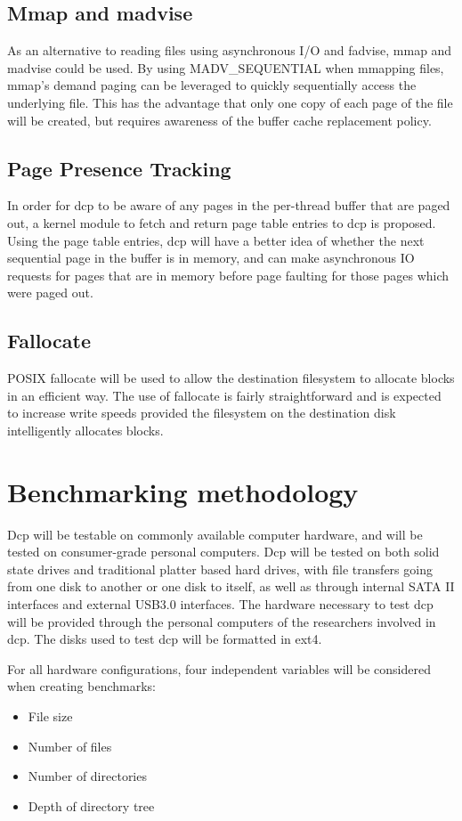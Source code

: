 \documentclass[12pt]{article}
\begin{document}
\subsection{Mmap and madvise}
As an alternative to reading files using asynchronous I/O and fadvise,
mmap and madvise could be used. By using MADV\_SEQUENTIAL when mmapping
files, mmap's demand paging can be leveraged to quickly sequentially access
the underlying file. This has the advantage that only one copy of each
page of the file will be created, but requires awareness of the buffer
cache replacement policy.

\subsection{Page Presence Tracking}
In order for dcp to be aware of any pages in the per-thread buffer that
are paged out, a kernel module to fetch and return page table entries to
dcp is proposed. Using the page table entries, dcp will have a better
idea of whether the next sequential page in the buffer is in memory,
and can make asynchronous IO requests for pages that are in memory
before page faulting for those pages which were paged out.

\subsection{Fallocate}
POSIX fallocate will be used to allow the destination filesystem to
allocate blocks in an efficient way. The use of fallocate is
fairly straightforward and is expected to increase write speeds
provided the filesystem on the destination disk intelligently
allocates blocks.

\section{Benchmarking methodology}
Dcp will be testable on commonly available computer hardware, and will be tested on
consumer-grade personal computers. Dcp will be tested on both solid state drives
and traditional platter based hard drives, with file transfers going from one disk to
another or one disk to itself, as well as through internal SATA II interfaces and
external USB3.0 interfaces. The hardware necessary to test dcp will be provided through
the personal computers of the researchers involved in dcp. The disks used to test dcp
will be formatted in ext4.

For all hardware configurations, four independent variables will be considered when
creating benchmarks:
\begin{itemize}
    \item File size
    \item Number of files
    \item Number of directories
    \item Depth of directory tree
\end{itemize}
\end{document}
